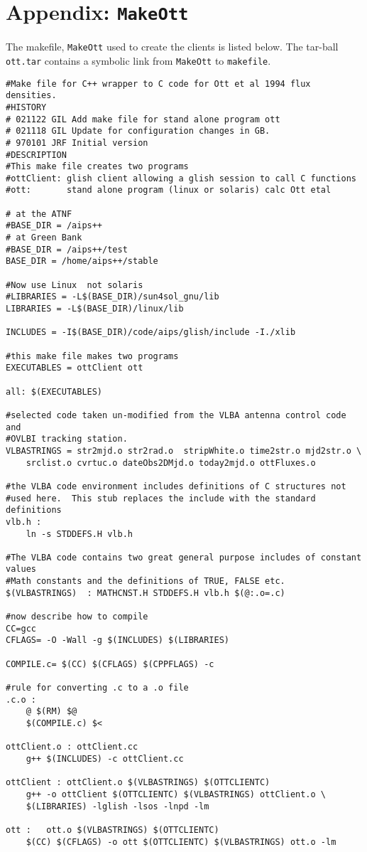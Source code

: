 \section{Appendix: {\tt MakeOtt}}
The makefile, {\tt MakeOtt} used to create the clients is listed below.
The tar-ball {\tt ott.tar} contains a symbolic link from {\tt MakeOtt} to 
{\tt makefile}.
\begin{verbatim}
#Make file for C++ wrapper to C code for Ott et al 1994 flux densities.
#HISTORY
# 021122 GIL Add make file for stand alone program ott
# 021118 GIL Update for configuration changes in GB.
# 970101 JRF Initial version
#DESCRIPTION
#This make file creates two programs
#ottClient: glish client allowing a glish session to call C functions
#ott:       stand alone program (linux or solaris) calc Ott etal 

# at the ATNF
#BASE_DIR = /aips++
# at Green Bank
#BASE_DIR = /aips++/test
BASE_DIR = /home/aips++/stable

#Now use Linux  not solaris
#LIBRARIES = -L$(BASE_DIR)/sun4sol_gnu/lib
LIBRARIES = -L$(BASE_DIR)/linux/lib 

INCLUDES = -I$(BASE_DIR)/code/aips/glish/include -I./xlib

#this make file makes two programs
EXECUTABLES = ottClient ott

all: $(EXECUTABLES)

#selected code taken un-modified from the VLBA antenna control code and
#OVLBI tracking station.
VLBASTRINGS = str2mjd.o str2rad.o  stripWhite.o time2str.o mjd2str.o \
	srclist.o cvrtuc.o dateObs2DMjd.o today2mjd.o ottFluxes.o

#the VLBA code environment includes definitions of C structures not
#used here.  This stub replaces the include with the standard definitions
vlb.h : 
	ln -s STDDEFS.H vlb.h

#The VLBA code contains two great general purpose includes of constant values
#Math constants and the definitions of TRUE, FALSE etc.
$(VLBASTRINGS)	: MATHCNST.H STDDEFS.H vlb.h $(@:.o=.c)

#now describe how to compile
CC=gcc
CFLAGS= -O -Wall -g $(INCLUDES) $(LIBRARIES)

COMPILE.c= $(CC) $(CFLAGS) $(CPPFLAGS) -c

#rule for converting .c to a .o file
.c.o :
	@ $(RM) $@
	$(COMPILE.c) $<

ottClient.o : ottClient.cc 
	g++ $(INCLUDES) -c ottClient.cc 

ottClient : ottClient.o $(VLBASTRINGS) $(OTTCLIENTC) 
	g++ -o ottClient $(OTTCLIENTC) $(VLBASTRINGS) ottClient.o \
	$(LIBRARIES) -lglish -lsos -lnpd -lm

ott :	ott.o $(VLBASTRINGS) $(OTTCLIENTC) 
	$(CC) $(CFLAGS) -o ott $(OTTCLIENTC) $(VLBASTRINGS) ott.o -lm
\end{verbatim}

%
